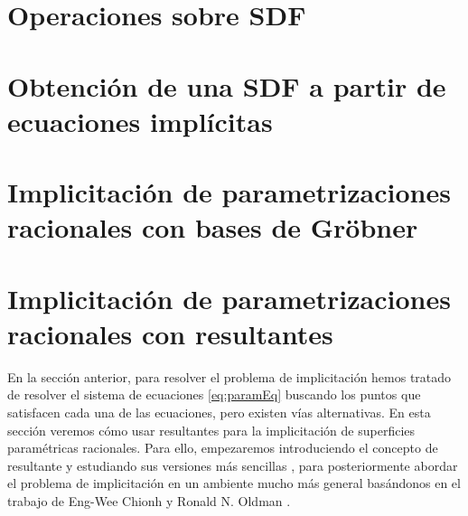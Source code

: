 \section{Operaciones sobre SDF}\label{sec:operaciones}


\section{Obtención de una SDF a partir de ecuaciones implícitas}\label{sec:aprox}


\section{Implicitación de parametrizaciones racionales con bases de Gröbner}\label{sec:grobner}


\section{Implicitación de parametrizaciones racionales con resultantes}\label{sec:radical}
En la sección anterior, para resolver el problema de implicitación hemos tratado de resolver el sistema de ecuaciones \eqref{eq:paramEq} buscando los puntos que satisfacen cada una de las ecuaciones, pero existen vías alternativas. En esta sección veremos cómo usar resultantes para la implicitación de superficies paramétricas racionales. Para ello, empezaremos introduciendo el concepto de resultante y estudiando sus versiones más sencillas \cite{ideals_varieties}, para posteriormente abordar el problema de implicitación en un ambiente mucho más general basándonos en el trabajo de Eng-Wee Chionh y Ronald N. Oldman \cite{res1}.





